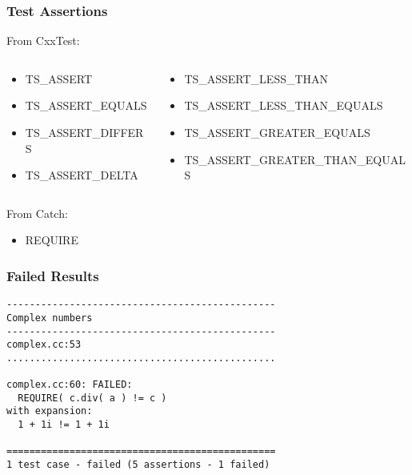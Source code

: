 \begin{frame}
  \frametitle{Test Assertions}
  From {\color{Base0D} CxxTest}:
  \begin{columns}[onlytextwidth]
    \begin{column}{0.4\textwidth}
      \begin{itemize}
      \item {\ttfamily\small TS\_ASSERT}
      \item {\ttfamily\small TS\_ASSERT\_EQUALS}
      \item {\ttfamily\small TS\_ASSERT\_DIFFERS}
      \item {\ttfamily\small TS\_ASSERT\_DELTA}
      \end{itemize}
    \end{column}
    \begin{column}{0.6\textwidth}
      \begin{itemize}
      \item {\ttfamily\small TS\_ASSERT\_LESS\_THAN}
      \item {\ttfamily\small TS\_ASSERT\_LESS\_THAN\_EQUALS}
      \item {\ttfamily\small TS\_ASSERT\_GREATER\_EQUALS}
      \item {\ttfamily\small TS\_ASSERT\_GREATER\_THAN\_EQUALS}
      \end{itemize}
    \end{column}
  \end{columns}
  \vspace{0.5cm}
  From {\color{Base0D} Catch}:
  \begin{itemize}
  \item {\ttfamily\small REQUIRE}
  \end{itemize}
\end{frame}

\begin{frame}[fragile]
  \frametitle{Failed Results}
  \begin{verbatim}
-----------------------------------------------
Complex numbers
-----------------------------------------------
complex.cc:53
...............................................

complex.cc:60: FAILED:
  REQUIRE( c.div( a ) != c )
with expansion:
  1 + 1i != 1 + 1i

===============================================
1 test case - failed (5 assertions - 1 failed)
  \end{verbatim}
\end{frame}

